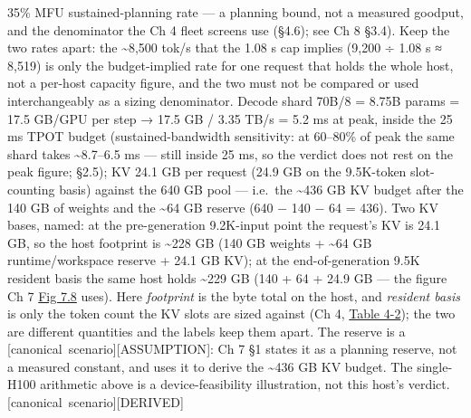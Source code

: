 35\% MFU sustained-planning rate --- a planning bound, not a measured
goodput, and the denominator the Ch 4 fleet screens use (§4.6); see Ch 8
§3.4). Keep the two rates apart: the \textasciitilde8,500 tok/s that the
1.08 s cap implies (9,200 ÷ 1.08 s ≈ 8,519) is only the budget-implied
rate for one request that holds the whole host, not a per-host capacity
figure, and the two must not be compared or used interchangeably as a
sizing denominator. Decode shard 70B/8 = 8.75B params = 17.5 GB/GPU per
step → 17.5 GB / 3.35 TB/s = 5.2 ms at peak, inside the 25 ms TPOT
budget (sustained-bandwidth sensitivity: at 60--80\% of peak the same
shard takes \textasciitilde8.7--6.5 ms --- still inside 25 ms, so the
verdict does not rest on the peak figure; §2.5); KV 24.1 GB per request
(24.9 GB on the 9.5K-token slot-counting basis) against the 640 GB pool
--- i.e.~the \textasciitilde436 GB KV budget after the 140 GB of weights
and the \textasciitilde64 GB reserve (640 − 140 − 64 = 436). Two KV
bases, named: at the pre-generation 9.2K-input point the request's KV is
24.1 GB, so the host footprint is \textasciitilde228 GB (140 GB weights
+ \textasciitilde64 GB runtime/workspace reserve + 24.1 GB KV); at the
end-of-generation 9.5K resident basis the same host holds
\textasciitilde229 GB (140 + 64 + 24.9 GB --- the figure Ch 7 \hyperref[fig:7.8]{Fig 7.8}
uses). Here \emph{footprint} is the byte total on the host, and
\emph{resident basis} is only the token count the KV slots are sized
against (Ch 4, \hyperref[tab:4.2]{Table 4-2}); the two are different quantities and the
labels keep them apart. The reserve is a \mbox{{[}canonical
scenario{]}}\hspace{0pt}\mbox{{[}ASSUMPTION{]}}: Ch 7 §1 states it as a planning reserve,
not a measured constant, and uses it to derive the \textasciitilde436 GB
KV budget. The single-H100 arithmetic above is a device-feasibility
illustration, not this host's verdict. \mbox{{[}canonical
scenario{]}}\hspace{0pt}\mbox{{[}DERIVED{]}}

